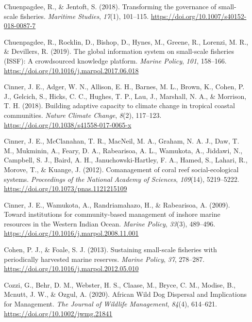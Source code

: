 \documentclass[
]{article}
\newlength{\cslhangindent}
\newlength{\cslentryspacingunit} %
\newenvironment{CSLReferences}[2] %
 {%
  \setlength{\parindent}{0pt}
  \ifodd #1
  \let\oldpar\par
  \def\par{\hangindent=\cslhangindent\oldpar}
  \fi
  \setlength{\parskip}{#2\cslentryspacingunit}
 }%
 {}
\begin{document}
\begin{CSLReferences}{1}{0}
\leavevmode{}%
Chuenpagdee, R., \& Jentoft, S. (2018). Transforming the governance of small-scale fisheries. \emph{Maritime Studies}, \emph{17}(1), 101--115. \url{https://doi.org/10.1007/s40152-018-0087-7}

\leavevmode{}%
Chuenpagdee, R., Rocklin, D., Bishop, D., Hynes, M., Greene, R., Lorenzi, M. R., \& Devillers, R. (2019). The global information system on small-scale fisheries ({ISSF}): {A} crowdsourced knowledge platform. \emph{Marine Policy}, \emph{101}, 158--166. \url{https://doi.org/10.1016/j.marpol.2017.06.018}

\leavevmode{}%
Cinner, J. E., Adger, W. N., Allison, E. H., Barnes, M. L., Brown, K., Cohen, P. J., Gelcich, S., Hicks, C. C., Hughes, T. P., Lau, J., Marshall, N. A., \& Morrison, T. H. (2018). Building adaptive capacity to climate change in tropical coastal communities. \emph{Nature Climate Change}, \emph{8}(2), 117--123. \url{https://doi.org/10.1038/s41558-017-0065-x}

\leavevmode{}%
Cinner, J. E., McClanahan, T. R., MacNeil, M. A., Graham, N. A. J., Daw, T. M., Mukminin, A., Feary, D. A., Rabearisoa, A. L., Wamukota, A., Jiddawi, N., Campbell, S. J., Baird, A. H., Januchowski-Hartley, F. A., Hamed, S., Lahari, R., Morove, T., \& Kuange, J. (2012). Comanagement of coral reef social-ecological systems. \emph{Proceedings of the National Academy of Sciences}, \emph{109}(14), 5219--5222. \url{https://doi.org/10.1073/pnas.1121215109}

\leavevmode{}%
Cinner, J. E., Wamukota, A., Randriamahazo, H., \& Rabearisoa, A. (2009). Toward institutions for community-based management of inshore marine resources in the {Western} {Indian} {Ocean}. \emph{Marine Policy}, \emph{33}(3), 489--496. \url{https://doi.org/10.1016/j.marpol.2008.11.001}

\leavevmode{}%
Cohen, P. J., \& Foale, S. J. (2013). Sustaining small-scale fisheries with periodically harvested marine reserves. \emph{Marine Policy}, \emph{37}, 278--287. \url{https://doi.org/10.1016/j.marpol.2012.05.010}

\leavevmode{}%
Cozzi, G., Behr, D. M., Webster, H. S., Claase, M., Bryce, C. M., Modise, B., Mcnutt, J. W., \& Ozgul, A. (2020). African {Wild} {Dog} {Dispersal} and {Implications} for {Management}. \emph{The Journal of Wildlife Management}, \emph{84}(4), 614--621. \url{https://doi.org/10.1002/jwmg.21841}


\end{CSLReferences}
\end{document}

